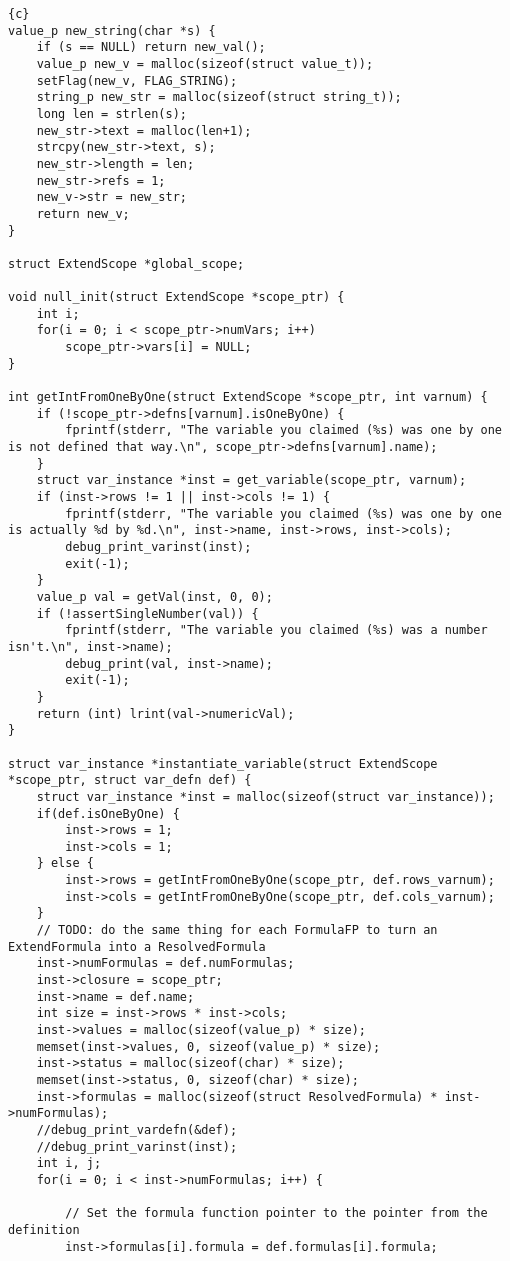\begin{lstlisting}{c}
value_p new_string(char *s) {
	if (s == NULL) return new_val();
	value_p new_v = malloc(sizeof(struct value_t));
	setFlag(new_v, FLAG_STRING);
	string_p new_str = malloc(sizeof(struct string_t));
	long len = strlen(s);
	new_str->text = malloc(len+1);
	strcpy(new_str->text, s);
	new_str->length = len;
	new_str->refs = 1;
	new_v->str = new_str;
	return new_v;
}

struct ExtendScope *global_scope;

void null_init(struct ExtendScope *scope_ptr) {
	int i;
	for(i = 0; i < scope_ptr->numVars; i++)
		scope_ptr->vars[i] = NULL;
}

int getIntFromOneByOne(struct ExtendScope *scope_ptr, int varnum) {
	if (!scope_ptr->defns[varnum].isOneByOne) {
		fprintf(stderr, "The variable you claimed (%s) was one by one is not defined that way.\n", scope_ptr->defns[varnum].name);
	}
	struct var_instance *inst = get_variable(scope_ptr, varnum);
	if (inst->rows != 1 || inst->cols != 1) {
		fprintf(stderr, "The variable you claimed (%s) was one by one is actually %d by %d.\n", inst->name, inst->rows, inst->cols);
		debug_print_varinst(inst);
		exit(-1);
	}
	value_p val = getVal(inst, 0, 0);
	if (!assertSingleNumber(val)) {
		fprintf(stderr, "The variable you claimed (%s) was a number isn't.\n", inst->name);
		debug_print(val, inst->name);
		exit(-1);
	}
	return (int) lrint(val->numericVal);
}

struct var_instance *instantiate_variable(struct ExtendScope *scope_ptr, struct var_defn def) {
	struct var_instance *inst = malloc(sizeof(struct var_instance));
	if(def.isOneByOne) {
		inst->rows = 1;
		inst->cols = 1;
	} else {
		inst->rows = getIntFromOneByOne(scope_ptr, def.rows_varnum);
		inst->cols = getIntFromOneByOne(scope_ptr, def.cols_varnum);
	}
	// TODO: do the same thing for each FormulaFP to turn an ExtendFormula into a ResolvedFormula
	inst->numFormulas = def.numFormulas;
	inst->closure = scope_ptr;
	inst->name = def.name;
	int size = inst->rows * inst->cols;
	inst->values = malloc(sizeof(value_p) * size);
	memset(inst->values, 0, sizeof(value_p) * size);
	inst->status = malloc(sizeof(char) * size);
	memset(inst->status, 0, sizeof(char) * size);
	inst->formulas = malloc(sizeof(struct ResolvedFormula) * inst->numFormulas);
	//debug_print_vardefn(&def);
	//debug_print_varinst(inst);
	int i, j;
	for(i = 0; i < inst->numFormulas; i++) {

		// Set the formula function pointer to the pointer from the definition
		inst->formulas[i].formula = def.formulas[i].formula;


\end{lstlisting}
